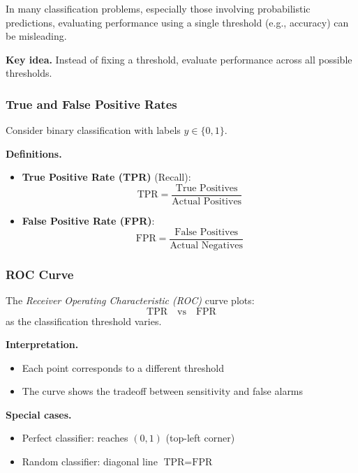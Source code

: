 In many classification problems, especially those involving probabilistic predictions, evaluating performance using a single threshold (e.g., accuracy) can be misleading.

\medskip

\noindent
\textbf{Key idea.}  
Instead of fixing a threshold, evaluate performance across all possible thresholds.

\subsubsection{True and False Positive Rates}

Consider binary classification with labels $y \in \{0,1\}$.

\medskip

\noindent
\textbf{Definitions.}

\begin{itemize}
    \item \textbf{True Positive Rate (TPR)} (Recall):
    \[
    \text{TPR} = \frac{\text{True Positives}}{\text{Actual Positives}}
    \]

    \item \textbf{False Positive Rate (FPR)}:
    \[
    \text{FPR} = \frac{\text{False Positives}}{\text{Actual Negatives}}
    \]
\end{itemize}

\subsubsection{ROC Curve}

The \emph{Receiver Operating Characteristic (ROC)} curve plots:
\[
\text{TPR} \quad \text{vs} \quad \text{FPR}
\]
as the classification threshold varies.

\medskip

\noindent
\textbf{Interpretation.}

\begin{itemize}
    \item Each point corresponds to a different threshold
    \item The curve shows the tradeoff between sensitivity and false alarms
\end{itemize}

\medskip

\noindent
\textbf{Special cases.}

\begin{itemize}
    \item Perfect classifier: reaches $(0,1)$ (top-left corner)
    \item Random classifier: diagonal line $\text{TPR} = \text{FPR}$
\end{itemize}

